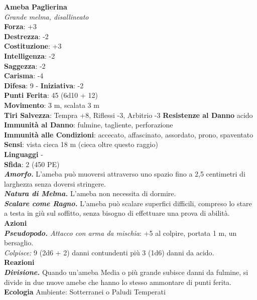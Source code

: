 \begin{multicols}{2}
\medskip\textbf{Ameba Paglierina}\\
\emph{Grande melma, disallineato}\\
\textbf{Forza}: +3\\
\textbf{Destrezza}: -2\\
\textbf{Costituzione}: +3\\
\textbf{Intelligenza}: -2\\
\textbf{Saggezza}: -2\\
\textbf{Carisma}: -4\\
\textbf{Difesa}: 9 - \textbf{Iniziativa}: -2\\
\textbf{Punti Ferita}: 45 (6d10 + 12)\\
\textbf{Movimento}: 3 m, scalata 3 m\\
\textbf{Tiri Salvezza}: Tempra +8, Riflessi -3, Arbitrio -3
\textbf{Resistenze al Danno} acido\\
\textbf{Immunità al Danno}: fulmine, tagliente, perforazione\\
\textbf{Immunità alle Condizioni}: accecato, affascinato, assordato, prono, spaventato\\
\textbf{Sensi}: vista cieca 18 m (cieca oltre questo raggio)\\
\textbf{Linguaggi} -\\
\textbf{Sfida}: 2 (450 PE)\smallskip\\
\emph{\textbf{Amorfo.}} L'ameba può muoversi attraverso uno spazio fino a 2,5 centimetri di larghezza senza doversi stringere.\\
\emph{\textbf{Natura di Melma.}} L'ameba non necessita di dormire.\\
\emph{\textbf{Scalare come Ragno.}} L'ameba può scalare superfici difficili, compreso lo stare a testa in giù sul soffitto, senza bisogno di effettuare una prova di abilità.\\
\smallskip\textbf{Azioni}\\
\emph{\textbf{Pseudopodo.} Attacco con arma da mischia}: +5 al colpire, portata 1 m, un bersaglio.\\
\emph{Colpisce:} 9 (2d6 + 2) danni contundenti più 3 (1d6) danni da acido.\\
\textbf{Reazioni}\\
\emph{\textbf{Divisione.}} Quando un'ameba Media o più grande subisce
danni da fulmine, si divide in due nuove amebe che hanno lo stesso ammontare di punti ferita.\\
\textbf{Ecologia}
Ambiente: Sotterranei o Paludi Temperati\\

\end{multicols}
